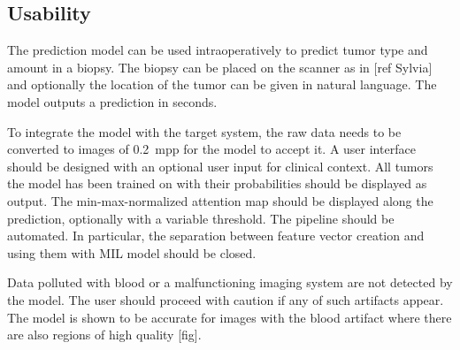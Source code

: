 \subsection{Usability}
The prediction model can be used intraoperatively to predict tumor type and amount in a biopsy.
The biopsy can be placed on the scanner as in [ref Sylvia] and optionally the location of the tumor can be given in natural language.
The model outputs a prediction in seconds.

To integrate the model with the target system, the raw data needs to be converted to images of \qty{0.2}{mpp} for the model to accept it.
A user interface should be designed with an optional user input for clinical context.
All tumors the model has been trained on with their probabilities should be displayed as output.
The min-max-normalized attention map should be displayed along the prediction, optionally with a variable threshold.
The pipeline should be automated.
In particular, the separation between feature vector creation and using them with MIL model should be closed.

Data polluted with blood or a malfunctioning imaging system are not detected by the model.
The user should proceed with caution if any of such artifacts appear.
The model is shown to be accurate for images with the blood artifact where there are also regions of high quality [fig].
